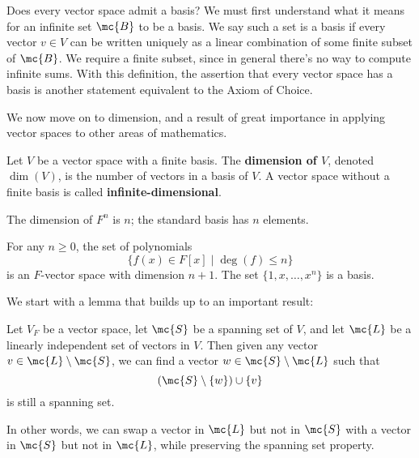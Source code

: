 \documentclass[math1530-lecture-notes]{subfiles}
\begin{document}
\begin{remark}
  Does every vector space admit a basis? We must first understand what it means for an infinite set
  $\mc{B}$ to be a basis. We say such a set is a basis if every vector $v\in V$ can be written
  uniquely as a linear combination of some finite subset of $\mc{B}$. We require a finite subset,
  since in general there's no way to compute infinite sums. With this definition, the assertion that
  every vector space has a basis is another statement equivalent to the Axiom of Choice.
\end{remark}

We now move on to dimension, and a result of great importance in applying vector spaces to other
areas of mathematics.

\begin{definition}[Dimension]{}
  Let $V$ be a vector space with a finite basis. The \textbf{dimension of $V$}, denoted $\dim(V)$,
  is the number of vectors in a basis of $V$. A vector space without a finite basis is called
  \textbf{infinite-dimensional}.
\end{definition}

\begin{example}
  The dimension of $F^n$ is $n$; the standard basis has $n$ elements.

  For any $n\ge 0$, the set of polynomials \[
    \{f(x)\in F[x]\mid \deg(f)\le n\} 
  \] is an $F$-vector space with dimension $n+1$. The set $\{ 1,x,\ldots,x^n \}$ is a basis.
\end{example}

We start with a lemma that builds up to an important result:
\begin{lemma}{}
  Let $V_F$ be a vector space, let $\mc{S}$ be a spanning set of $V$, and let $\mc{L}$ be a linearly
  independent set of vectors in $V$. Then given any vector $v\in \mc{L}\setminus \mc{S}$, we can
  find a vector $w\in \mc{S}\setminus \mc{L}$ such that \[
    \left( \mc{S}\setminus \{ w \} \right) \cup \{ v \}
  \] is still a spanning set.

  In other words, we can swap a vector in $\mc{L}$ but not in $\mc{S}$ with a vector in $\mc{S}$ but
  not in $\mc{L}$, while preserving the spanning set property.
\end{lemma}
\end{document}
